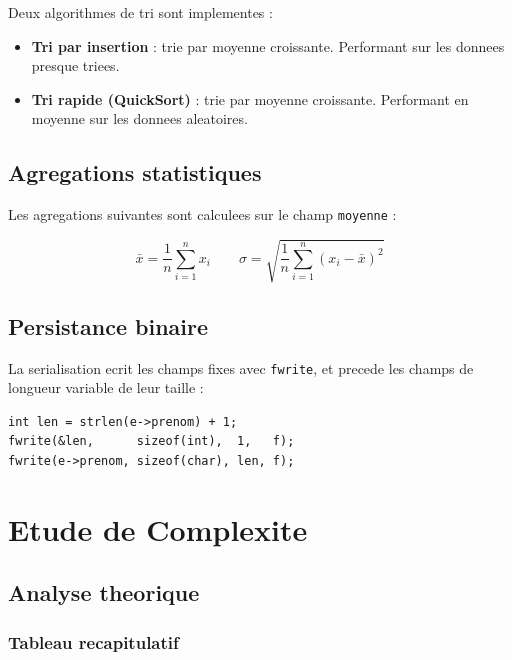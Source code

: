 \documentclass[12pt,a4paper]{article}
\begin{document}
Deux algorithmes de tri sont implementes :

\begin{itemize}
    \item \textbf{Tri par insertion} : trie par moyenne croissante.
          Performant sur les donnees presque triees.
    \item \textbf{Tri rapide (QuickSort)} : trie par moyenne croissante.
          Performant en moyenne sur les donnees aleatoires.
\end{itemize}

\subsection{Agregations statistiques}

Les agregations suivantes sont calculees sur le champ \texttt{moyenne} :

\[
\bar{x} = \frac{1}{n}\sum_{i=1}^{n} x_i \qquad
\sigma = \sqrt{\frac{1}{n}\sum_{i=1}^{n}(x_i - \bar{x})^2}
\]

\subsection{Persistance binaire}

La serialisation ecrit les champs fixes avec \texttt{fwrite},
et precede les champs de longueur variable de leur taille :

\begin{lstlisting}[caption={Serialisation du prenom}]
int len = strlen(e->prenom) + 1;
fwrite(&len,      sizeof(int),  1,   f);
fwrite(e->prenom, sizeof(char), len, f);
\end{lstlisting}

\section{Etude de Complexite}

\subsection{Analyse theorique}

\subsubsection{Tableau recapitulatif}
\end{document}
